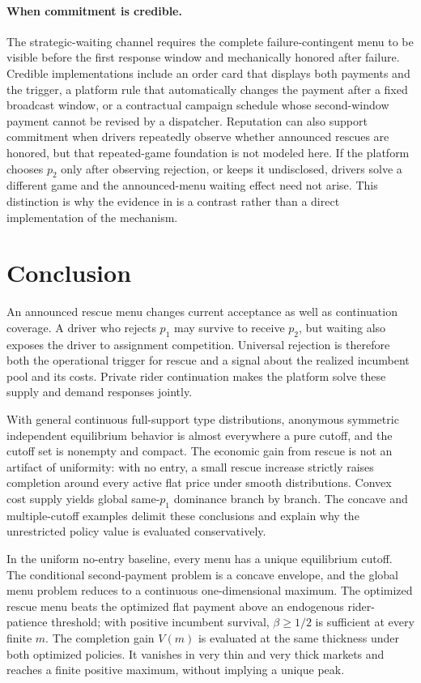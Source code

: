 \documentclass[mnsc,blindrev]{informs3}
\begin{document}
\paragraph{When commitment is credible.}
The strategic-waiting channel requires the complete failure-contingent menu
to be visible before the first response window and mechanically honored
after failure.  Credible implementations include an order card that displays
both payments and the trigger, a platform rule that automatically changes the
payment after a fixed broadcast window, or a contractual campaign schedule
whose second-window payment cannot be revised by a dispatcher.  Reputation
can also support commitment when drivers repeatedly observe whether announced
rescues are honored, but that repeated-game foundation is not modeled here.
If the platform chooses $p_2$ only after observing rejection, or keeps it
undisclosed, drivers solve a different game and the announced-menu waiting
effect need not arise.  This distinction is why the evidence in
\citet{WuEtAl2022} is a contrast rather than a direct implementation of the
mechanism.

\section{Conclusion}
\label{sec:conclusion}

An announced rescue menu changes current acceptance as well as continuation
coverage.  A driver who rejects $p_1$ may survive to receive $p_2$, but waiting
also exposes the driver to assignment competition.  Universal rejection is
therefore both the operational trigger for rescue and a signal about the
realized incumbent pool and its costs.  Private rider continuation makes the
platform solve these supply and demand responses jointly.

With general continuous full-support type distributions, anonymous symmetric
independent equilibrium behavior is almost everywhere a pure cutoff, and the
cutoff set is nonempty and compact.  The economic gain from rescue is not an
artifact of uniformity: with no entry, a small rescue increase strictly raises
completion around every active flat price under smooth distributions.  Convex
cost supply yields global same-$p_1$ dominance branch by branch.  The concave
and multiple-cutoff examples delimit these conclusions and explain why the
unrestricted policy value is evaluated conservatively.

In the uniform no-entry baseline, every
menu has a unique equilibrium cutoff.  The conditional second-payment problem is
a concave envelope, and the global menu problem reduces to a continuous
one-dimensional maximum.  The optimized rescue menu beats the optimized flat
payment above an endogenous rider-patience threshold; with positive incumbent
survival, $\beta\ge1/2$ is sufficient at every finite $m$.  The completion
gain $V(m)$ is evaluated at the same thickness under both optimized policies.
It vanishes in very thin and very thick markets and reaches a finite positive
maximum, without implying a unique peak.
\end{document}
